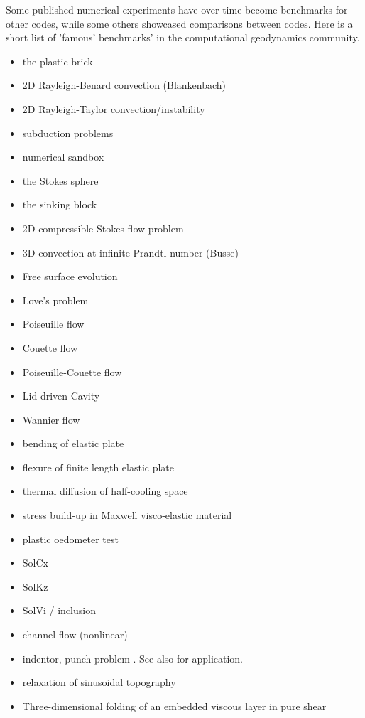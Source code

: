 Some published numerical experiments have over time become benchmarks for other codes, while some 
others showcased comparisons between codes. Here is a short list of 'famous' benchmarks' in the 
computational geodynamics community.

\begin{itemize}
\item the plastic brick \cite{lemm08,kaus10,qurj09,mishin11,maie12}
\item 2D Rayleigh-Benard convection (Blankenbach)  \cite{blbc89,trha98,chhl08,king09,lezh11,vyrc13,trab90}
\item 2D Rayleigh-Taylor convection/instability \cite{pros81,trab90,popo92,soga01,bast02,taki03,bomh06, basd08,qurj09,saev10,lezh11,vyrc13,vkks97,bomh06,chtl13,deka08,mishin11,maie12,fusc13} 
\item subduction problems \cite{scbe08,vack08,cehg14}
\item numerical sandbox \cite{bbeg06,maie12,busa16}
\item the Stokes sphere \cite{galemanual}
\item the sinking block \cite{thie11,cehg14,gery10,geyu03,mishin11,maie12}
\item 2D compressible Stokes flow problem \cite{lezh08}
\item 3D convection at infinite Prandtl number (Busse) \cite{bucc93,trha98}
\item Free surface evolution \cite{crsg12}
\item Love's problem \cite{bebe04}
\item Poiseuille flow \cite{fojg94,fuku11}
\item Couette flow
\item Poiseuille-Couette flow \cite{fusc13}
\item Lid driven Cavity \cite{foth79,bope98,kawa61}
\item Wannier flow \cite{wann50,yemu99}
\item bending of elastic plate \cite{cehg14,boht08a}
\item flexure of finite length elastic plate \cite{chtl13}
\item thermal diffusion of half-cooling space \cite{chtl13}
\item stress build-up in Maxwell visco-elastic material \cite{geyu07,chtl13}
\item plastic oedometer test  \cite{chtl13}
\item SolCx
\item SolKz
\item SolVi / inclusion \cite{kapo06,maie12,deka08}
\item channel flow (nonlinear) \cite{maie12,frbt19,gery10}
\item indentor, punch problem \cite{thfb08,mota77,gltf18}. See also \cite{hukm03,fojd04,gerb12} for application.
\item relaxation of sinusoidal topography \cite{crsg12,robh17}
\item Three-dimensional folding of an embedded viscous layer in pure shear \cite{flet91}


\end{itemize}

